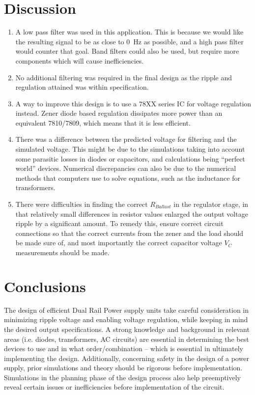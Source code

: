 \documentclass[12pt]{article}
\begin{document}
\section{Discussion}
\begin{enumerate}
    \item A low pass filter was used in this application. This is because we would like the resulting signal to be as close to \SI{0}{\hertz} as possible, and a high pass filter would counter that goal. Band filters could also be used, but require more components which will cause inefficiencies.
    \item No additional filtering was required in the final design as the ripple and regulation attained was within specification.
    \item A way to improve this design is to use a 78XX series IC for voltage regulation instead. Zener diode based regulation dissipates more power than an equivalent 7810/7809, which means that it is less efficient.
    \item There was a difference between the predicted voltage for filtering and the simulated voltage. This might be due to the simulations taking into account some parasitic losses in diodes or capacitors, and calculations being ``perfect world'' devices. Numerical discrepancies can also be due to the numerical methods that computers use to solve equations, such as the inductance for transformers.
    \item There were difficulties in finding the correct $R_{Ballast}$  in the regulator stage, in that relatively small differences in resistor values enlarged the output voltage ripple by a significant amount. To remedy this, ensure correct circuit connections so that the correct currents from the zener and the load should be made sure of, and most importantly the correct capacitor voltage $V_C$ measurements should be made.
\end{enumerate}

\section{Conclusions}
The design of efficient Dual Rail Power supply units take careful consideration in minimizing ripple voltage and enabling voltage regulation, while keeping in mind the desired output specifications. A strong knowledge and background in relevant areas (i.e. diodes, transformers, AC circuits) are essential in determining the best devices to use and in what order/combination -- which is essential in ultimately implementing the design. Additionally, concerning safety in the design of a power supply, prior simulations and theory should be rigorous before implementation. Simulations in the planning phase of the design process also help preemptively reveal certain issues or inefficiencies before implementation of the circuit. %
 

\newpage


\end{document}
